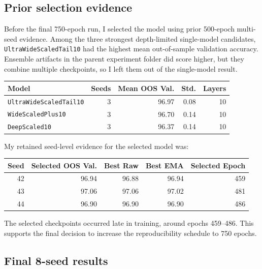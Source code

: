 \documentclass[11pt]{article}
\begin{document}
\subsection{Prior selection evidence}

Before the final 750-epoch run, I selected the model using prior 500-epoch
multi-seed evidence. Among the three strongest depth-limited single-model candidates,
\texttt{UltraWideScaledTail10} had the highest mean out-of-sample validation accuracy.
Ensemble artifacts in the parent experiment folder did score higher, but they combine
multiple checkpoints, so I left them out of the single-model result.

\begin{center}
\begin{tabular}{lrrrr}
\toprule
\textbf{Model} & \textbf{Seeds} & \textbf{Mean OOS Val.} & \textbf{Std.} & \textbf{Layers} \\
\midrule
\texttt{UltraWideScaledTail10} & 3 & 96.97 & 0.08 & 10 \\
\texttt{WideScaledPlus10} & 3 & 96.70 & 0.14 & 10 \\
\texttt{DeepScaled10} & 3 & 96.37 & 0.14 & 10 \\
\bottomrule
\end{tabular}
\end{center}

My retained seed-level evidence for the selected model was:

\begin{center}
\begin{tabular}{rrrrr}
\toprule
\textbf{Seed} & \textbf{Selected OOS Val.} & \textbf{Best Raw} & \textbf{Best EMA} & \textbf{Selected Epoch} \\
\midrule
42 & 96.94 & 96.88 & 96.94 & 459 \\
43 & 97.06 & 97.06 & 97.02 & 481 \\
44 & 96.90 & 96.90 & 96.90 & 486 \\
\bottomrule
\end{tabular}
\end{center}

The selected checkpoints occurred late in training, around epochs 459--486. This supports
the final decision to increase the reproducibility schedule to 750 epochs.

\subsection{Final 8-seed results}
\end{document}
